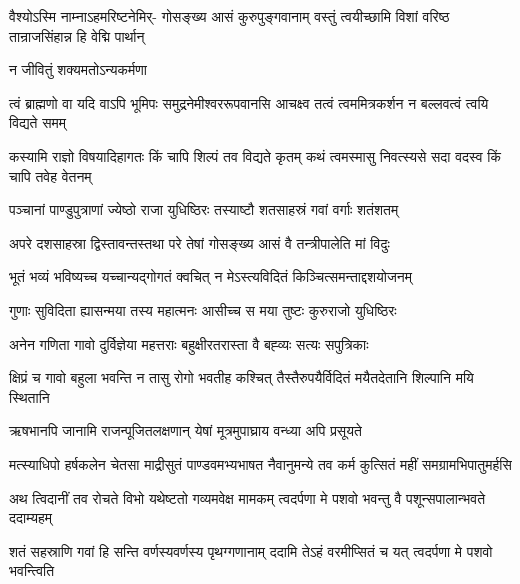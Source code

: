 \fourlineindentedshloka
{वैश्योऽस्मि नाम्नाऽहमरिष्टनेमिर्-}
{गोसङ्ख्य आसं कुरुपुङ्गवानाम्}
{वस्तुं त्वयीच्छामि विशां वरिष्ठ}
{तान्राजसिंहान्न हि वेद्मि पार्थान्}


{न जीवितुं शक्यमतोऽन्यकर्मणा\hspace{\shlokaspaceskip}}\\





\fourlineindentedshloka
{त्वं ब्राह्मणो वा यदि वाऽपि भूमिपः}
{समुद्रनेमीश्वररूपवानसि}
{आचक्ष्व तत्वं त्वममित्रकर्शन}
{न बल्लवत्वं त्वयि विद्यते समम्}


\fourlineindentedshloka
{कस्यामि राज्ञो विषयादिहागतः}
{किं चापि शिल्पं तव विद्यते कृतम्}
{कथं त्वमस्मासु निवत्स्यसे सदा}
{वदस्व किं चापि तवेह वेतनम्}




\twolineshloka
{पञ्चानां पाण्डुपुत्राणां ज्येष्ठो राजा युधिष्ठिरः}
{तस्याष्टौ शतसाहस्रं गवां वर्गाः शतंशतम्}


\twolineshloka
{अपरे दशसाहस्रा द्विस्तावन्तस्तथा परे}
{तेषां गोसङ्ख्य आसं वै तन्त्रीपालेति मां विदुः}


\twolineshloka
{भूतं भव्यं भविष्यच्च यच्चान्यद्गोगतं क्वचित्}
{न मेऽस्त्यविदितं किञ्चित्समन्ताद्दशयोजनम्}


\twolineshloka
{गुणाः सुविदिता ह्यासन्मया तस्य महात्मनः}
{आसीच्च स मया तुष्टः कुरुराजो युधिष्ठिरः}


\twolineshloka
{अनेन गणिता गावो दुर्विज्ञेया महत्तराः}
{बहुक्षीरतरास्ता वै बह्व्यः सत्यः सपुत्रिकाः}


\fourlineindentedshloka
{क्षिप्रं च गावो बहुला भवन्ति}
{न तासु रोगो भवतीह कश्चित्}
{तैस्तैरुपयैर्विदितं मयैतदेतानि}
{शिल्पानि मयि स्थितानि}


\twolineshloka
{ऋषभानपि जानामि राजन्पूजितलक्षणान्}
{येषां मूत्रमुपाघ्राय वन्ध्या अपि प्रसूयते}



\fourlineindentedshloka
{मत्स्याधिपो हर्षकलेन चेतसा}
{माद्रीसुतं पाण्डवमभ्यभाषत}
{नैवानुमन्ये तव कर्म कुत्सितं}
{महीं समग्रामभिपातुमर्हसि}


\fourlineindentedshloka
{अथ त्विदानीं तव रोचते विभो}
{यथेष्टतो गव्यमवेक्ष मामकम्}
{त्वदर्पणा मे पशवो भवन्तु वै}
{पशून्सपालान्भवते ददाम्यहम्}


\fourlineindentedshloka
{शतं सहस्राणि गवां हि सन्ति}
{वर्णस्यवर्णस्य पृथग्गणानाम्}
{ददामि तेऽहं वरमीप्सितं च यत्}
{त्वदर्पणा मे पशवो भवन्त्विति}


